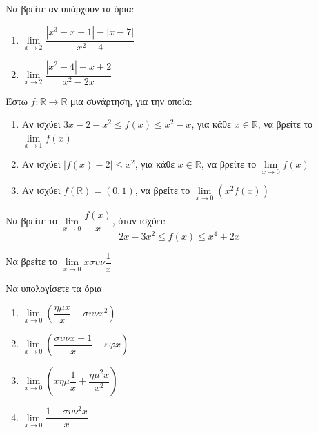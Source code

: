 \documentclass{presentation}
\begin{document}
\begin{askisi}
  Να βρείτε αν υπάρχουν τα όρια:
  \begin{enumerate}
    \item $\lim\limits_{x \to 2}{ \dfrac{|x^3-x-1|-|x-7|}{x^2-4} }$ \pause
    \item $\lim\limits_{x \to 2}{ \dfrac{|x^2-4|-x+2}{x^2-2x} }$
  \end{enumerate}

\end{askisi}

\begin{askisi}
  Έστω $f:\mathbb{R}\to\mathbb{R}$ μια συνάρτηση, για την οποία:
  \begin{enumerate}
    \item Αν ισχύει $3x-2-x^2\le f(x) \le x^2-x$, για κάθε $x\in\mathbb{R}$, να βρείτε το $\lim\limits_{x \to 1}{ f(x) }$ \pause
    \item Αν ισχύει $|f(x)-2|\le x^2$, για κάθε $x\in\mathbb{R}$, να βρείτε το $\lim\limits_{x \to 0}{ f(x) }$ \pause
    \item Αν ισχύει $f(\mathbb{R})=(0,1)$, να βρείτε το $\lim\limits_{x \to 0}{ \left(x^2f(x)  \right) }$
  \end{enumerate}

\end{askisi}

\begin{askisi}
  Να βρείτε το $\lim\limits_{x \to 0}{ \dfrac{f(x)}{x} }$, όταν ισχύει:
  $$2x-3x^2\le f(x) \le x^4+2x$$

\end{askisi}

\begin{askisi}
  Να βρείτε το $\lim\limits_{x \to 0}{ xσυν\dfrac{1}{x} }$

\end{askisi}

\begin{askisi}
  Να υπολογίσετε τα όρια
  \begin{enumerate}
    \item $\lim\limits_{x \to 0}{ \left( \dfrac{ημx}{x}+συνx^2 \right) }$ \pause
    \item $\lim\limits_{x \to 0}{ \left( \dfrac{συνx-1}{x}-εφx \right) }$ \pause
    \item $\lim\limits_{x \to 0}{ \left( xημ\dfrac{1}{x}+\dfrac{ημ^2x}{x^2} \right)}$ \pause
    \item $\lim\limits_{x \to 0}{ \dfrac{1-συν^2x}{x} }$
  \end{enumerate}

\end{askisi}
\end{document}
